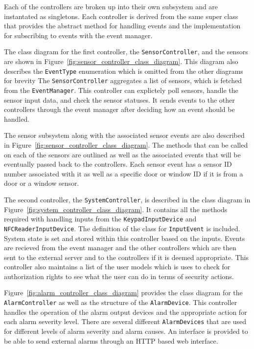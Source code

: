 \documentclass{report}
\begin{document}
Each of the controllers are broken up into their own subsystem and are
instantated as singletons. Each controller is derived from the same super class
that provides the abstract method for handling events and the
implementation for subscribing to events with the event manager.

The class diagram for the first controller, the \texttt{SensorController}, and
the sensors are shown in Figure~\ref{fig:sensor_controller_class_diagram}. This
diagram also describes the \texttt{EventType} enumeration which is omitted from
the other diagrams for brevity The \texttt{SensorController} aggregates a list
of sensors, which is fetched from the \texttt{EventManager}. This controller can
explictely poll sensors, handle the sensor input data, and check the sensor
statuses. It sends events to the other controllers through the event manager
after deciding how an event should be handled. 

The sensor subsystem along with the associated sensor events are also described
in Figure~\ref{fig:sensor_controller_class_diagram}. The methods that can be
called on each of the sensors are outlined as well as the associated events that
will be eventually passed back to the controllers. Each sensor event has a
sensor ID number associated with it as well as a specific door or window ID
if it is from a door or a window sensor.

The second controller, the \texttt{SystemController}, is described in the class
diagram in Figure~\ref{fig:system_controller_class_diagram}. It contains all
the methods required with handling inputs from the \texttt{KeypadInputDevice}
and \texttt{NFCReaderInputDevice}. The definition of the class for
\texttt{InputEvent} is included. System state is set and stored within this
controller based on the inputs. Events are recieved from the event manager and
the other controllers which are then sent to the external server and to the
controllers if it is deemed appropriate. This controller also maintains a list
of the user models which is uses to check for authorization rights to see what
the user can do in terms of security actions.

Figure~\ref{fig:alarm_controller_class_diagram} provides the class diagram for
the \texttt{AlarmController} as well as the structure of the
\texttt{AlarmDevice}. This controller handles the operation of the alarm output
devices and the appropriate action for each alarm severity level. There are
several different \texttt{AlarmDevices} that are used for different levels of
alarm severity and alarm causes. An interface is provided to be able to send
external alarms through an HTTP based web interface.
\end{document}
